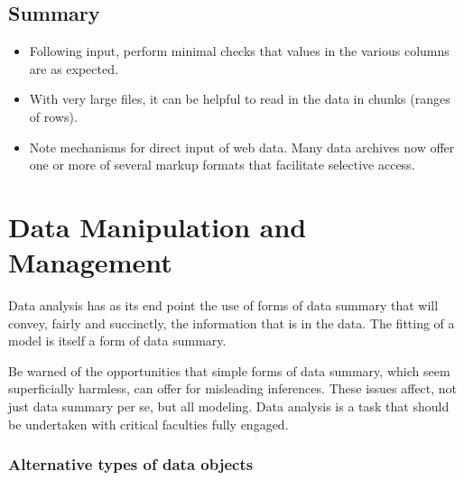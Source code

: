 \documentclass{tufte-book}\usepackage[]{graphicx}\usepackage[]{color}
\begin{document}
\section{Summary}
\begin{itemize}

\item[] Following input, perform minimal checks that
  values in the various columns are as expected.

\item[] With very large files, it can be helpful to read in the
  data in chunks (ranges of rows).

\item[] Note mechanisms for direct input of web data.  Many data
  archives now offer one or more of several markup formats that
  facilitate selective access.
\end{itemize}
\cleartooddpage

\chapter{Data Manipulation and Management}\label{ch:manip}





Data analysis has as its end point the use of forms of data summary
that will convey, fairly and succinctly, the information that is in
the data.  The fitting of a model is itself a form of data summary.

Be warned of
the opportunities that simple forms of data summary, which seem
superficially harmless, can offer for misleading inferences.  These
issues affect, not just data summary per se, but all modeling.  Data
analysis is a task that should be undertaken with critical
faculties fully engaged.

\subsection*{Alternative types of data objects}
\end{document}
